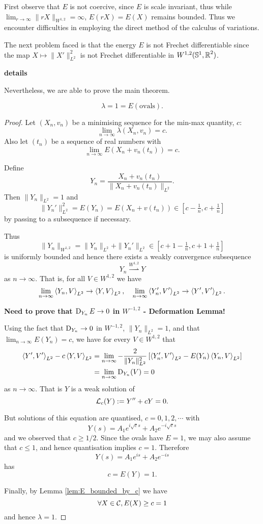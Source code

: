\documentclass[12pt]{article}
\begin{document}
First observe that \(E\) is not coercive, since \(E\) is scale invariant, thus while \(\lim_{r\to \infty} \|rX\|_{W^{1,2}} = \infty\), \(E(r X) = E(X)\) remains bounded. Thus we encounter difficulties in employing the direct method of the calculus of variations.

The next problem faced is that the energy \(E\) is not Frechet differentiable since the map \(X \mapsto \|X'\|_{L^2}^2\) is not Frechet differentiable in \(W^{1,2} (\operatorname{\mathbb{S}^1}, \operatorname{\mathbb{R}}^2)\).

\textbf{details}

Nevertheless, we are able to prove the main theorem.

\begin{theorem}
\[
\lambda = 1 = E(\text{ovals}).
\]
\end{theorem}

\begin{proof}
Let \((X_n, v_n)\) be a minimising sequence for the min-max quantity, \(c\):
\[
\lim_{n \to \infty} \lambda(X_n, v_n) = c.
\]
Also let \((t_n)\) be a sequence of real numbers with
\[
\lim_{n\to \infty} E(X_n + v_n(t_n)) = c.
\]

Define
\[
Y_n = \frac{X_n + v_n(t_n)}{\|X_n + v_n(t_n)\|_{L^2}}.
\]
Then \(\|Y_n\|_{L^2} = 1\) and
\[
\|Y_n'\|_{L^2}^2 = E(Y_n) = E(X_n + v(t_n)) \in [c-\tfrac{1}{n}, c + \tfrac{1}{n}]
\]
by passing to a subsequence if necessary.

Thus
\[
\|Y_n\|_{W^{1,2}} = \|Y_n\|_{L^2} + \|Y_n'\|_{L^2} \in [c+1-\tfrac{1}{n}, c + 1 + \tfrac{1}{n}]
\]
is uniformly bounded and hence there exists a weakly convergence subsequence
\[
Y_n \overset{W^{1,2}}{\rightharpoonup} Y
\]
as \(n \to \infty\). That is, for all \(V \in W^{1,2}\) we have
\[
\lim_{n\to \infty} \left\langle{Y_n},{V}\right\rangle_{L^2} \to \left\langle{Y},{V}\right\rangle_{L^2}, \quad \lim_{n\to \infty} \left\langle{Y_n'},{V'}\right\rangle_{L^2} \to \left\langle{Y'},{V'}\right\rangle_{L^2}.
\]

\textbf{Need to prove that \(\operatorname{D}_{Y_n} E \to 0\) in \(W^{-1,2}\) - Deformation Lemma!}

Using the fact that \(\operatorname{D}_{Y_n} \to 0\) in \(W^{-1,2}\), \(\|Y_n\|_{L^2} = 1\), and that \(\lim_{n\to\infty} E(Y_n) = c\), we have for every \(V \in W^{1,2}\) that
\[
\begin{split}
\left\langle{Y'},{V'}\right\rangle_{L^2} - c \left\langle{Y},{V}\right\rangle_{L^2} &= \lim_{n\to \infty} -\frac{2}{\|Y_n\|_{L^2}^2} \left[\left\langle{Y_n'},{V'}\right\rangle_{L^2} - E(Y_n) \left\langle{Y_n},{V}\right\rangle_{L^2}\right] \\
&= \lim_{n\to \infty} \operatorname{D}_{Y_n} (V) = 0
\end{split}
\]
as \(n \to \infty\). That is \(Y\) is a weak solution of
\[
\operatorname{\mathcal{L}}_c(Y) := Y'' + c Y = 0.
\]

But solutions of this equation are quantised, \(c = 0, 1, 2, \cdots\) with
\[
Y(s) = A_1 e^{i \sqrt{c} s} + A_2 e^{-i \sqrt{c} s}
\]
and we observed that \(c \geq 1/2\). Since the ovals have \(E = 1\), we may also assume that \(c \leq 1\), and hence quantisation implies \(c = 1\). Therefore
\[
Y(s) = A_1 e^{is} + A_2 e^{-is}
\]
has
\[
c = E(Y) = 1.
\]

Finally, by Lemma \ref{lem:E_bounded_by_c} we have
\[
\forall X \in \operatorname{\mathcal{C}}, E(X) \geq c = 1
\]
and hence \(\lambda = 1\).
\end{proof}
\end{document}
